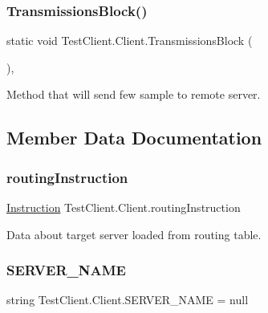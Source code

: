 \subsubsection{\texorpdfstring{Transmissions\+Block()}{TransmissionsBlock()}}
{\footnotesize\ttfamily static void Test\+Client.\+Client.\+Transmissions\+Block (\begin{DoxyParamCaption}{ }\end{DoxyParamCaption})\hspace{0.3cm}{\ttfamily [static]}, {\ttfamily [private]}}



Method that will send few sample to remote server. 



\subsection{Member Data Documentation}
\mbox{\label{class_test_client_1_1_client_ac5365a862c09065db31123126239a7ee}} 
\subsubsection{\texorpdfstring{routing\+Instruction}{routingInstruction}}
{\footnotesize\ttfamily \mbox{\hyperlink{class_pipes_provider_1_1_networking_1_1_routing_1_1_instruction}{Instruction}} Test\+Client.\+Client.\+routing\+Instruction\hspace{0.3cm}{\ttfamily [static]}}



Data about target server loaded from routing table. 

\mbox{\label{class_test_client_1_1_client_a7fdac87931c97ce7fde6c4fc622bcfa6}} 
\subsubsection{\texorpdfstring{S\+E\+R\+V\+E\+R\+\_\+\+N\+A\+ME}{SERVER\_NAME}}
{\footnotesize\ttfamily string Test\+Client.\+Client.\+S\+E\+R\+V\+E\+R\+\_\+\+N\+A\+ME = null\hspace{0.3cm}{\ttfamily [static]}}




